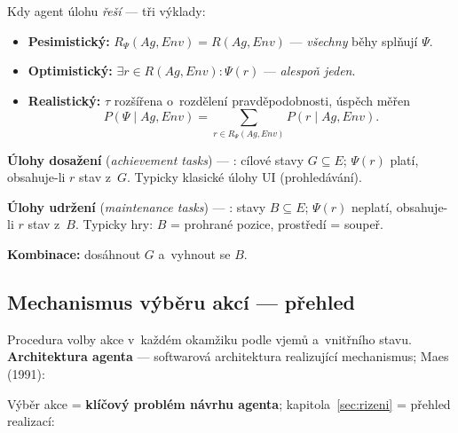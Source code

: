 \documentclass[11pt,a4paper]{article}
\theoremstyle{definition}
\begin{document}
Kdy agent úlohu \emph{řeší} --- tři výklady:
\begin{itemize}
\item \textbf{Pesimistický:} $R_\Psi(Ag,\mathit{Env}) = R(Ag,\mathit{Env})$ --- \emph{všechny}
  běhy splňují $\Psi$.
\item \textbf{Optimistický:} $\exists r \in R(Ag,\mathit{Env}): \Psi(r)$ --- \emph{alespoň jeden}.
\item \textbf{Realistický:} $\tau$ rozšířena o~rozdělení pravděpodobnosti, úspěch měřen
  \[ P(\Psi \mid Ag,\mathit{Env}) = \sum_{r \in R_\Psi(Ag,\mathit{Env})} P(r \mid Ag,\mathit{Env}). \]
\end{itemize}

\begin{defbox}
\textbf{Úlohy dosažení} (\emph{achievement tasks}) --- : cílové stavy
$G \subseteq E$; $\Psi(r)$ platí, obsahuje-li $r$ stav z~$G$. Typicky klasické úlohy UI
(prohledávání).

\textbf{Úlohy udržení} (\emph{maintenance tasks}) --- :  stavy
$B \subseteq E$; $\Psi(r)$ neplatí, obsahuje-li $r$ stav z~$B$. Typicky hry: $B$ = prohrané
pozice, prostředí = soupeř.

\textbf{Kombinace:} dosáhnout $G$ a~vyhnout se $B$.
\end{defbox}

\subsection{Mechanismus výběru akcí --- přehled}
\label{ssec:vyber-akci}

\begin{defbox}
Procedura volby akce v~každém okamžiku podle vjemů a~vnitřního stavu.
\textbf{Architektura agenta} --- softwarová architektura realizující mechanismus; Maes (1991): 
\end{defbox}

Výběr akce = \textbf{klíčový problém návrhu agenta}; kapitola~\ref{sec:rizeni} = přehled
realizací:
\end{document}
